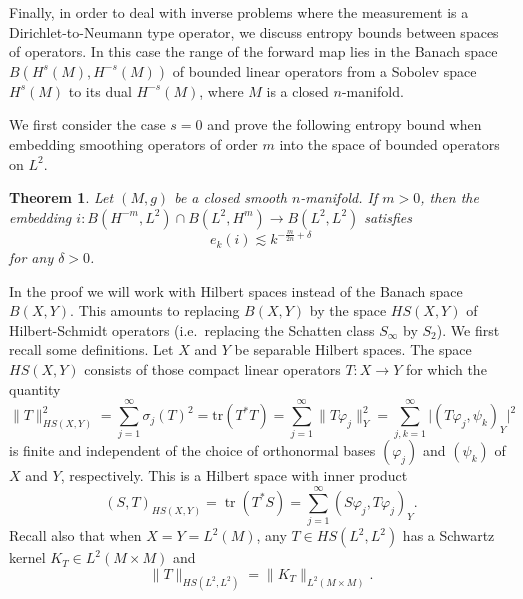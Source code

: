 \documentclass[12pt,twoside]{amsart}
\numberwithin{equation}{section}
\newtheorem{theorem}{Theorem}[section]
\DeclareMathOperator{\tr}{tr}
\newcommand{\abs}[1]{\lvert #1 \rvert}          %
\newcommand{\norm}[1]{\lVert #1 \rVert}         %
\begin{document}
Finally, in order to deal with inverse problems where the measurement is a Dirichlet-to-Neumann type operator, we discuss entropy bounds between spaces of operators. In this case the range of the forward map lies in the Banach space $B(H^s(M),H^{-s}(M))$ of bounded linear operators from a Sobolev space $H^s(M)$ to its dual $H^{-s}(M)$, where $M$ is a closed $n$-manifold.

We first consider the case $s=0$ and prove the following entropy bound when embedding smoothing operators of order $m$ into the space of bounded operators on $L^2$.

\begin{theorem} \label{thm_entropy_bounded_operators_initial}
  Let $(M,g)$ be a closed smooth $n$-manifold. If $m>0$, then the embedding
$ i: B(H^{-m}, L^2) \cap B(L^2, H^m) \to B(L^2,L^2)$ satisfies
\begin{equation} \label{b_initial_entropy_bound}
e_k(i) \lesssim k^{-\frac{m}{2n}+ \delta}
\end{equation}
for any $\delta > 0$.
\end{theorem}

In the proof we will work with Hilbert spaces instead of the Banach space $B(X, Y)$. This amounts to replacing $B(X,Y)$ by the space $HS(X,Y)$ of Hilbert-Schmidt operators (i.e.\ replacing the Schatten class $S_{\infty}$ by $S_2$). We first recall some definitions. Let $X$ and $Y$ be separable Hilbert spaces. The space $HS(X,Y)$ consists of those compact linear operators $T: X \to Y$ for which the quantity
\begin{equation} \label{hsxy_equivalent_norms}
\norm{T}_{HS(X,Y)}^2 = \sum_{j=1}^{\infty} \sigma_j(T)^2 = \mathrm{tr}(T^* T) = \sum_{j=1}^{\infty} \norm{T\varphi_j}_Y^2 = \sum_{j,k=1}^{\infty} \abs{(T\varphi_j, \psi_k)_Y}^2
\end{equation}
is finite and independent of the choice of orthonormal bases $(\varphi_j)$ and $(\psi_k)$ of $X$ and $Y$, respectively. This is a Hilbert space with inner product 
\[
(S, T)_{HS(X,Y)} = \tr(T^* S) = \sum_{j=1}^{\infty} (S \varphi_j, T \varphi_j)_Y.
\]
Recall also that when $X = Y = L^2(M)$, any $T \in HS(L^2, L^2)$ has a Schwartz kernel $K_T \in L^2(M \times M)$ and 
\begin{equation} \label{hs_ltwo_kernel}
\norm{T}_{HS(L^2, L^2)} = \norm{K_T}_{L^2(M \times M)}.
\end{equation}
\end{document}

